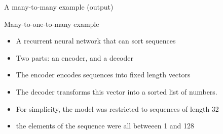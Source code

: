 \documentclass[10pt]{beamer}
\begin{document}
\begin{frame}{A many-to-many example (output)}

\end{frame}



\begin{frame}{Many-to-one-to-many example}


\begin{itemize}
\item  A recurrent neural network that can sort sequences
\item Two parts: an encoder, and a decoder
\item The encoder encodes sequences into fixed length vectors
\item The decoder transforms this vector into a sorted list of numbers.
\item For simplicity, the model was restricted to sequences of length 32
\item the elements of the sequence were all betweeen 1 and 128
\end{itemize}

 \end{frame}
\end{document}

